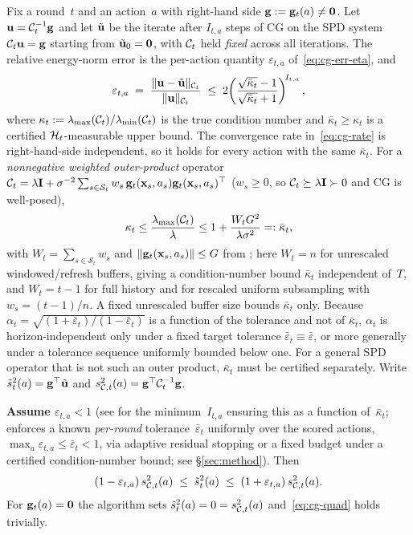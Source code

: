 \begin{lemma}\label{lem:cg}
Fix a round~$t$ and an action~$a$ with right-hand side
$\mathbf{g}:=\mathbf{g}_t(a)\ne\mathbf0$.  Let $\mathbf{u} = \mathcal{C}_t^{-1}\mathbf{g}$ and let $\tilde{\mathbf{u}}$ be
the iterate after $I_{t,a}$ steps of CG on the SPD system $\mathcal{C}_t\mathbf{u}=\mathbf{g}$
starting from $\tilde{\mathbf{u}}_0=\mathbf{0}$, with $\mathcal{C}_t$ held \emph{fixed} across
all iterations.  The relative energy-norm error is the per-action quantity
$\varepsilon_{t,a}$ of~\eqref{eq:cg-err-eta}, and
\begin{equation}\label{eq:cg-rate}
  \varepsilon_{t,a}
  \;=\;
  \frac{\|\mathbf{u}-\tilde{\mathbf{u}}\|_{\mathcal{C}_t}}{\|\mathbf{u}\|_{\mathcal{C}_t}}
  \;\le\;
  2\!\left(\frac{\sqrt{\bar\kappa_t}-1}{\sqrt{\bar\kappa_t}+1}\right)^{\!I_{t,a}},
\end{equation}
where
$\kappa_t:=\lambda_{\max}(\mathcal{C}_t)/\lambda_{\min}(\mathcal{C}_t)$ is the true
condition number and $\bar\kappa_t\ge\kappa_t$ is a certified
$\mathcal{H}_t$-measurable upper bound.  The convergence rate in~\eqref{eq:cg-rate} is right-hand-side
independent, so it holds for every action with the same $\bar\kappa_t$.
For a \emph{nonnegative weighted outer-product} operator
$\mathcal{C}_t=\lambda\mathbf{I}+\sigma^{-2}\sum_{s\in\mathcal{S}_t}w_s\,
\mathbf{g}_t(\mathbf{x}_s,a_s)\mathbf{g}_t(\mathbf{x}_s,a_s)^\top$ ($w_s\ge0$, so
$\mathcal{C}_t\succeq\lambda\mathbf{I}\succ0$ and CG is well-posed),
\[
\kappa_t\le\frac{\lambda_{\max}(\mathcal{C}_t)}{\lambda}
\le1+\frac{W_tG^2}{\lambda\sigma^2}=: \bar\kappa_t,
\]
with $W_t=\sum_{s\in\mathcal{S}_t}w_s$ and
$\|\mathbf{g}_t(\mathbf{x}_s,a_s)\|\le G$ from ; here $W_t=n$ for unrescaled
windowed/refresh buffers, giving a condition-number bound $\bar\kappa_t$
independent of~$T$, and $W_t=t{-}1$ for full history and for rescaled uniform
subsampling with $w_s=(t{-}1)/n$.  A fixed unrescaled buffer size bounds
$\bar\kappa_t$ only.  Because
$\alpha_t=\sqrt{(1+\bar\varepsilon_t)/(1-\bar\varepsilon_t)}$ is a function of
the tolerance and not of $\bar\kappa_t$, $\alpha_t$ is horizon-independent only
under a fixed target tolerance $\bar\varepsilon_t\equiv\bar\varepsilon$, or more
generally under a tolerance sequence uniformly bounded below one.  For a general
SPD operator that is not such an outer product, $\bar\kappa_t$ must be certified
separately.
Write $\tilde{s}_t^2(a) = \mathbf{g}^\top\tilde{\mathbf{u}}$ and
$s_{\mathcal{C},t}^2(a)=\mathbf{g}^\top\mathcal{C}_t^{-1}\mathbf{g}$.

\textbf{Assume $\varepsilon_{t,a} < 1$}
(see  for the minimum~$I_{t,a}$ ensuring this as a function
of~$\bar\kappa_t$;
 enforces a known \emph{per-round} tolerance~$\bar\varepsilon_t$
uniformly over the scored actions, $\max_a\varepsilon_{t,a}\le\bar\varepsilon_t<1$,
via adaptive residual stopping or a fixed budget under a certified
condition-number bound; see \S\ref{sec:method}).
Then
\begin{equation}\label{eq:cg-quad}
  (1-\varepsilon_{t,a})\,s_{\mathcal{C},t}^2(a)
  \;\le\;
  \tilde{s}_t^2(a)
  \;\le\;
  (1+\varepsilon_{t,a})\,s_{\mathcal{C},t}^2(a).
\end{equation}
For $\mathbf{g}_t(a)=\mathbf0$ the algorithm sets
$\tilde{s}_t^2(a)=0=s_{\mathcal{C},t}^2(a)$ and~\eqref{eq:cg-quad} holds trivially.
\end{lemma}

